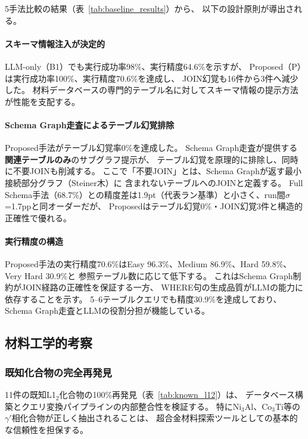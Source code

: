\documentclass[5p,twocolumn]{elsarticle}
\begin{document}
5手法比較の結果（表~\ref{tab:baseline_results}）から、
以下の設計原則が導出される。

\paragraph{スキーマ情報注入が決定的}
LLM-only（B1）でも実行成功率98\%、実行精度64.6\%を示すが、
Proposed（P）は実行成功率100\%、実行精度70.6\%を達成し、
JOIN幻覚も16件から3件へ減少した。
材料データベースの専門的テーブル名に対してスキーマ情報の提示方法が性能を支配する。

\paragraph{Schema Graph走査によるテーブル幻覚排除}
Proposed手法がテーブル幻覚率0\%を達成した。
Schema Graph走査が提供する\textbf{関連テーブルのみ}のサブグラフ提示が、
テーブル幻覚を原理的に排除し、同時に不要JOINも削減する。
ここで「不要JOIN」とは、Schema Graphが返す最小接続部分グラフ（Steiner木）に
含まれないテーブルへのJOINと定義する。
Full Schema手法（68.7\%）との精度差は1.9pt（代表ラン基準）と小さく、run間$\sigma$=1.7ppと同オーダーだが、
Proposedはテーブル幻覚0\%・JOIN幻覚3件と構造的正確性で優れる。

\paragraph{実行精度の構造}
Proposed手法の実行精度70.6\%はEasy 96.3\%、Medium 86.9\%、Hard 59.8\%、Very Hard 30.9\%と
参照テーブル数に応じて低下する。
これはSchema Graph制約がJOIN経路の正確性を保証する一方、
WHERE句の生成品質がLLMの能力に依存することを示す。
5--6テーブルクエリでも精度30.9\%を達成しており、
Schema Graph走査とLLMの役割分担が機能している。

\subsection{材料工学的考察}

\subsubsection{既知化合物の完全再発見}

11件の既知L1$_2$化合物の100\%再発見（表~\ref{tab:known_l12}）は、
データベース構築とクエリ変換パイプラインの内部整合性を検証する。
特にNi$_3$Al、Co$_3$Ti等の$\gamma'$相化合物が正しく抽出されることは、
超合金材料探索ツールとしての基本的な信頼性を担保する。
\end{document}

